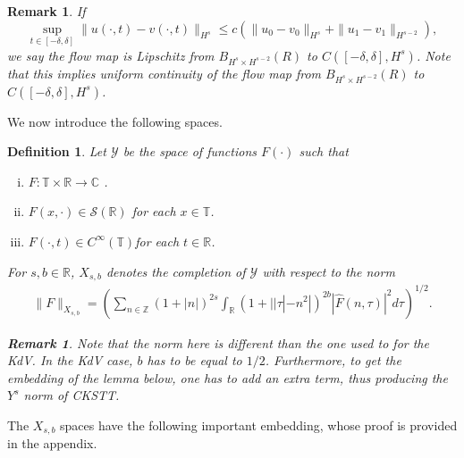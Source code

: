 \documentclass[12pt,reqno]{amsart}
\numberwithin{equation}{section}  %
\newcommand{\rr}{\mathbb{R}}
\newcommand{\zz}{\mathbb{Z}}
\newcommand{\cc}{\mathbb{C}}
\newcommand{\ci}{\mathbb{T}}
\newcommand{\wh}{\widehat}
\newtheorem{definition}[theorem]{Definition}
\newtheorem{remark}[theorem]{Remark}
\begin{document}
%
%
\begin{framed}
\begin{remark}
  If $$\sup_{t \in [-\delta, \delta]}\|u(\cdot, t) - v(\cdot, t)
  \|_{H^{s}} \le c \left( \|u_{0} - v_0 \|_{H^{s}} + \|u_{1} - v_1 \|_{H^{s-2}}
  \right),$$ we
  say the flow map is \emph{Lipschitz} from $B_{H^{s} \times H^{s-2}}(R)$ 
  to $C(\left[ -\delta, \delta \right], H^s)$. 
%
%
Note that this implies uniform continuity of the flow map from $B_{H^{s}
\times H^{s-2}}(R)$ to $C(\left[ -\delta, \delta \right], H^s)$.
\label{rem:lipschitz-cont}
\end{remark}
\end{framed}
%
%
We now introduce the following spaces. 
%
%
\begin{definition}
  Let $\mathcal{Y}$ be the space of functions $F(\cdot)$ such that
  \begin{enumerate}[(i)]
   \item{$F: \ci \times \rr \to \cc$ }.
   \item{ $F(x, \cdot) \in \mathcal{S}(\rr)$ for each $x \in \ci$}.
   \item{ $F(\cdot, t) \in C^{\infty}(\ci)$for each $t \in \rr$}.
  \end{enumerate}
  For $s, b \in \rr$, $X_{s,b}$ denotes the completion of $\mathcal{Y}$ with
  respect to the norm
  \begin{equation}
  \begin{split}
    \|F\|_{X_{s,b}} = \left( \sum_{n \in \zz} (1 + |n|)^{2s} \int_{\rr}
    (1 + | | \tau | - n^{2} |)^{2b} |\wh{F}(n, \tau)|^{2} d \tau\right)^{1/2}.
  \end{split}
  \label{eqn:bous-norm}
  \end{equation}
  \begin{framed}
    \begin{remark}
    Note that the norm here is different than the one used to for the KdV. In
    the KdV case, $b$ has to be equal to $1/2$. Furthermore, to get the embedding
    of the lemma below, one has to add an extra term, thus producing the
    $Y^{s}$ norm of CKSTT.
    \label{rem:alternate-space}
    \end{remark}
  \end{framed}
\end{definition}
%
The $X_{s,b}$ spaces have the following important embedding, whose proof is
provided in the appendix.
%
%
%
%
%
%
\end{document}
